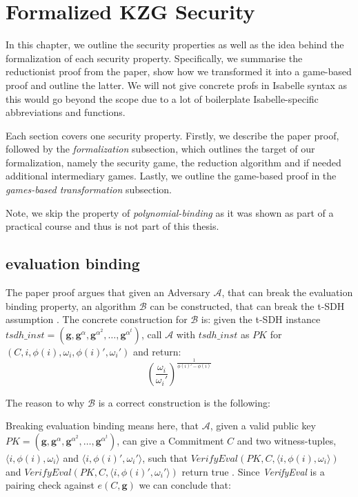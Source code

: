 \chapter{Formalized KZG Security}\label{chapter:security}
In this chapter, we outline the security properties as well as the idea behind the formalization of each security property. Specifically, we summarise the reductionist proof from the paper, show how we transformed it into a game-based proof and outline the latter. We will not give concrete profs in Isabelle syntax as this would go beyond the scope due to a lot of boilerplate Isabelle-specific abbreviations and functions.

Each section covers one security property. Firstly, we describe the paper proof, followed by the \textit{formalization} subsection, which outlines the target of our formalization, namely the security game, the reduction algorithm and if needed additional intermediary games. Lastly, we outline the game-based proof in the \textit{games-based transformation} subsection.

Note, we skip the property of \textit{polynomial-binding} as it was shown as part of a practical course and thus is not part of this thesis.

\section{evaluation binding}
The paper proof argues that given an Adversary $\mathcal{A}$, that can break the evaluation binding property, an algorithm $\mathcal{B}$ can be constructed, that can break the t-SDH assumption \parencite{KZG}. The concrete construction for $\mathcal{B}$ is: given the t-SDH instance $tsdh\_inst =(\mathbf{g}, \mathbf{g}^{\alpha}, \mathbf{g}^{\alpha^2},\dots, \mathbf{g}^{\alpha^t})$, call $\mathcal{A}$ with $tsdh\_inst$ as $PK$ for $(C,i,\phi(i),\omega_i,\phi(i)',\omega_i')$ and return: 
$$(\frac{\omega_i}{\omega_i'})^{\frac{1}{\phi(i)'-\phi(i)}}$$

The reason to why $\mathcal{B}$ is a correct construction is the following: 

Breaking evaluation binding means here, that $\mathcal{A}$, given a valid public key $PK=(\mathbf{g}, \mathbf{g}^{\alpha}, \mathbf{g}^{\alpha^2},\dots, \mathbf{g}^{\alpha^t})$, can give a Commitment $C$ and two witness-tuples, $\langle i, \phi(i),\omega_i\rangle$ and $\langle i, \phi(i)', \omega_i'\rangle$, such that $VerifyEval(PK, C,\langle i,\phi(i), \omega_i\rangle )$ and $VerifyEval(PK, C,\langle i,\phi(i)', \omega_i'\rangle )$ return true \parencite{KZG}. Since \textit{VerifyEval} is a pairing check against $e(C,\mathbf{g})$ we can conclude that: 

